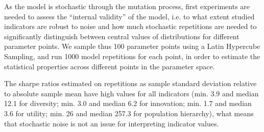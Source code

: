\documentclass[letterpaper]{article}
\begin{document}

As the model is stochastic through the mutation process, first experiments are needed to assess the ``internal validity'' of the model, i.e. to what extent studied indicators are robust to noise and how much stochastic repetitions are needed to significantly distinguish between central values of distributions for different parameter points. We sample thus 100 parameter points using a Latin Hypercube Sampling, and run 1000 model repetitions for each point, in order to estimate the statistical properties across different points in the parameter space.

The sharpe ratios estimated on repetitions as sample standard deviation relative to absolute sample mean have high values for all indicators (min. 3.9 and median 12.1 for diversity; min. 3.0 and median 6.2 for innovation; min. 1.7 and median 3.6 for utility; min. 26 and median 257.3 for population hierarchy), what means that stochastic noise is not an issue for interpreting indicator values.
\end{document}
